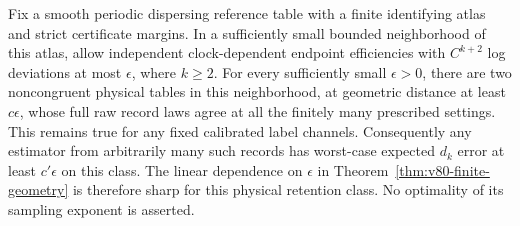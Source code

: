\begin{corollary}
\label{cor:v80-physical-floor}
Fix a smooth periodic dispersing reference table with a finite
identifying atlas and strict certificate margins.  In a sufficiently
small bounded neighborhood of this atlas, allow independent
clock-dependent endpoint efficiencies with $C^{k+2}$ log deviations
at most $\epsilon$, where $k\ge2$.  For every sufficiently small
$\epsilon>0$, there are two noncongruent physical tables in this
neighborhood, at geometric distance at least $c\epsilon$, whose full
raw record laws agree at all the finitely many prescribed settings.
This remains true for any fixed calibrated label channels.
Consequently any estimator from arbitrarily many such records has
worst-case expected $d_k$ error at least $c'\epsilon$ on this class.
The linear dependence on $\epsilon$ in
Theorem~\ref{thm:v80-finite-geometry} is therefore sharp for this
physical retention class.  No optimality of its sampling exponent is
asserted.
\end{corollary}
